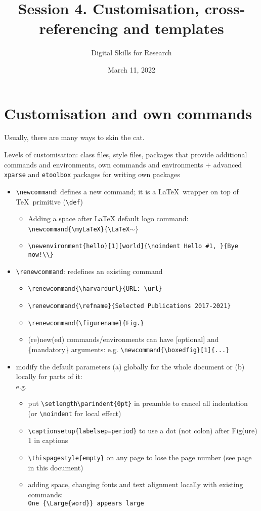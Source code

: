 \documentclass[a4paper,11pt]{article}
\title{Session 4. Customisation, cross-referencing and templates}
\author{Digital Skills for Research}
\date{March 11, 2022}
\newcommand{\myLaTeX}{\LaTeX~}
\renewcommand*{\figurename}{Fig.}
\newcommand{\boxedfig}[1]{%
	\setlength{\fboxsep}{5pt}%
	\setlength{\fboxrule}{3pt}%
	\fbox{\texttt{[image: \#1]}}%
}
\begin{document}
\maketitle
\tableofcontents

\section{Customisation and own commands}\label{sec:own}

Usually, there are many ways to skin the \hypertarget{wd:random}{cat}.

Levels of customisation: 
class files, style files, packages that provide additional commands and environments, own commands and environments + advanced \texttt{xparse} and \texttt{etoolbox} packages for writing own packages

\begin{itemize}
	\item \verb|\newcommand|: defines a new command; it is a \myLaTeX wrapper on top of \TeX~primitive (\verb|\def|) 
	\begin{itemize}
		\item Adding a space after LaTeX default logo command: \\
		\verb|\newcommand{\myLaTeX}{\LaTeX|$\sim$\}
		\item \verb|\newenvironment{hello}[1][world]{\noindent Hello #1, }{Bye now!\\}|
	\end{itemize}
	\item \verb|\renewcommand|: redefines an existing command
	\begin{itemize}
		\item \verb|\renewcommand{\harvardurl}{URL: \url}|
		\item \verb|\renewcommand{\refname}{Selected Publications 2017-2021}|
		\item \verb|\renewcommand{\figurename}{Fig.}|
		\item (re)new(ed) commands/environments can have [optional] and \{mandatory\} arguments: e.g. \verb|\newcommand{\boxedfig}[1]{...}|
		
	\end{itemize}
	\item modify the default parameters (a) globally for the whole document or (b) locally for parts of it: \\ e.g. 
	\begin{itemize}
		\item put \verb|\setlength\parindent{0pt}| in preamble to cancel all indentation (or \verb|\noindent| for local effect)
		\item \verb|\captionsetup{labelsep=period}| to use a dot (not colon) after Fig(ure) 1 in captions
		\item \verb|\thispagestyle{empty}| on any page to lose the page number (see page \pageref{pg:empty} in this document)
		\item adding space, changing fonts and text alignment locally with existing commands: \\ 
		\verb|One {\Large{word}} appears large|
	\end{itemize}
	
\end{itemize}
\end{document}

